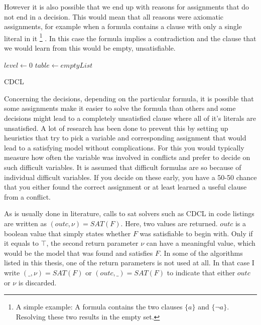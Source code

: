 However it is also possible that we end up with reasons for assignments that do not end in a decision. This would mean that all reasons were axiomatic assignments, for example when a formula contains a clause with only a single literal in it \footnote{A simple example: A formula contains the two clauses $\{a\}$ and $\{\neg a\}$. Resolving these two results in the empty set.}  .
In this case the formula implies a contradiction and the clause that we would learn from this would be empty, unsatisfiable.






\begin{algorithm}
\DontPrintSemicolon
{}
$level \gets 0$\;
$table \gets emptyList$\;
\caption{{\sc CDCL}}
\end{algorithm}


Concerning the decisions, depending on the particular formula, it is possible that some assignments make it easier to solve the formula than others and some decisions might lead to a completely unsatisfied clause where all of it's literals are unsatisfied. A lot of research has been done to prevent this by setting up heuristics that try to pick a variable and corresponding assignment that would lead to a satisfying model without complications. For this you would typically measure how often the variable was involved in conflicts and prefer to decide on such difficult variables. It is assumed that difficult formulas are so because of individual difficult variables. If you decide on these early, you have a 50-50 chance that you either found the correct assignment or at least learned a useful clause from a conflict.

As is usually done in literature, calls to sat solvers such as CDCL in code listings are written as $(outc,\nu) = SAT(F)$. Here, two values are returned. $outc$ is a boolean value that simply states whether $F$ was satisfiable to begin with. Only if it equals to $\top$, the second return parameter $\nu$ can have a meaningful value, which would be the model that was found and satisfies $F$. In some of the algorithms listed in this thesis, one of the return parameters is not used at all. In that case I write $(\_,\nu) = SAT(F)$ or $(outc,\_) = SAT(F)$ to indicate that either $outc$ or $\nu$ is discarded.